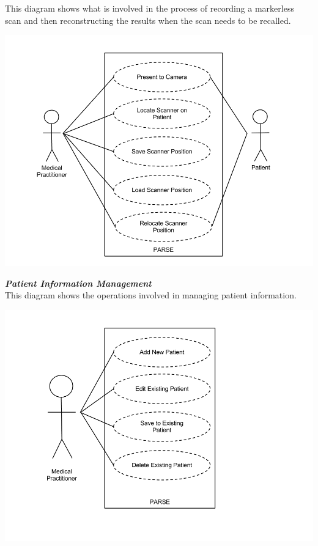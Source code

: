 This diagram shows what is involved in the process of recording a markerless scan and then reconstructing the results when the scan needs to be recalled. \\

\begin{center}
    \includegraphics[scale=0.275]{images/uml4.png}
\end{center}

\pagebreak

\emph{\bf{Patient Information Management}}\\

This diagram shows the operations involved in managing patient information. \\

\begin{center}
    \includegraphics[scale=0.275]{images/uml5.png}
\end{center}

